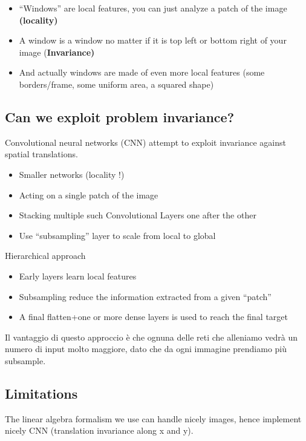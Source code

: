 \begin{itemize}
	\item “Windows” are local features, you can just analyze a patch of the image \textbf{(locality)}
	\item A window is a window no matter if it is top left or bottom right of	your image (\textbf{Invariance)}
	\item And actually windows are made of even more local features (some borders/frame, some uniform area, a squared shape)
\end{itemize}

\subsection{Can we exploit problem invariance?}

Convolutional neural networks (CNN) attempt to exploit invariance against spatial translations.
\begin{itemize}
	\item Smaller networks (locality !)
	\item Acting on a single patch of the image
	\item Stacking multiple such Convolutional Layers one after the other
	\item Use “subsampling” layer to scale from local to global
\end{itemize}

Hierarchical approach

\begin{itemize}
	\item Early layers learn local features
	\item Subsampling reduce the information extracted from a given “patch”
	\item A final flatten+one or more dense layers is used to reach the final target
\end{itemize}

Il vantaggio di questo approccio è che ognuna delle reti che alleniamo vedrà un numero di input molto maggiore, dato che da ogni immagine prendiamo più subsample.


\subsection{Limitations}

The linear algebra formalism we use can handle nicely images, hence implement nicely CNN (translation invariance along x and y).\\

